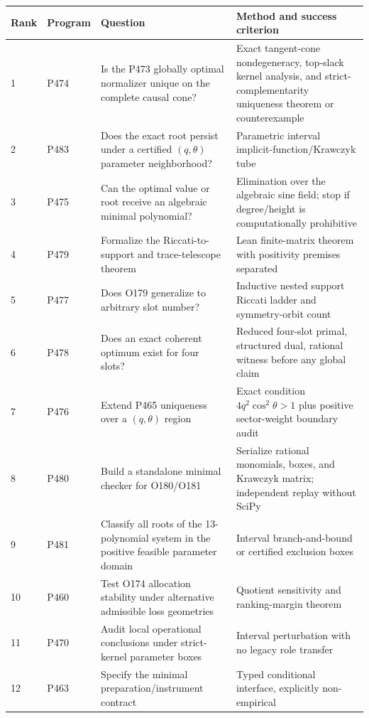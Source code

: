 \documentclass[11pt,a4paper,openany]{report}
\begin{document}
\begin{center}
\begingroup\small
\setlength{\tabcolsep}{2.5pt}
\renewcommand{\arraystretch}{1.16}
\begin{longtable}{@{}p{}p{}p{}p{}@{}}
\toprule
\textbf{Rank} & \textbf{Program} & \textbf{Question} & \textbf{Method and success criterion} \\
\midrule
\endhead
1 & P474 & Is the P473 globally optimal normalizer unique on the complete causal cone? & Exact tangent-cone nondegeneracy, top-slack kernel analysis, and strict-complementarity uniqueness theorem or counterexample \\
2 & P483 & Does the exact root persist under a certified \((q,\theta)\) parameter neighborhood? & Parametric interval implicit-function/\allowbreak{}Krawczyk tube \\
3 & P475 & Can the optimal value or root receive an algebraic minimal polynomial? & Elimination over the algebraic sine field; stop if degree/\allowbreak{}height is computationally prohibitive \\
4 & P479 & Formalize the Riccati-to-support and trace-telescope theorem & Lean finite-matrix theorem with positivity premises separated \\
5 & P477 & Does O179 generalize to arbitrary slot number? & Inductive nested support Riccati ladder and symmetry-orbit count \\
6 & P478 & Does an exact coherent optimum exist for four slots? & Reduced four-slot primal, structured dual, rational witness before any global claim \\
7 & P476 & Extend P465 uniqueness over a \((q,\theta)\) region & Exact condition \(4q^2\cos^2\theta>1\) plus positive sector-weight boundary audit \\
8 & P480 & Build a standalone minimal checker for O180/\allowbreak{}O181 & Serialize rational monomials, boxes, and Krawczyk matrix; independent replay without SciPy \\
9 & P481 & Classify all roots of the 13-polynomial system in the positive feasible parameter domain & Interval branch-and-bound or certified exclusion boxes \\
10 & P460 & Test O174 allocation stability under alternative admissible loss geometries & Quotient sensitivity and ranking-margin theorem \\
11 & P470 & Audit local operational conclusions under strict-kernel parameter boxes & Interval perturbation with no legacy role transfer \\
12 & P463 & Specify the minimal preparation/\allowbreak{}instrument contract & Typed conditional interface, explicitly non-empirical \\
\bottomrule
\end{longtable}
\endgroup
\end{center}
\end{document}
